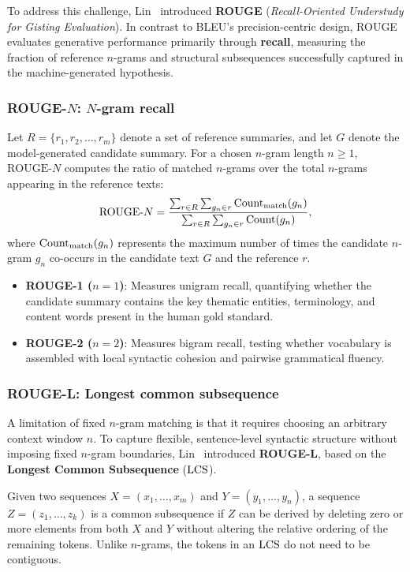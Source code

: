 \documentclass[../../../main.tex]{subfiles}
\begin{document}
To address this challenge, Lin~\cite{lin2004rouge} introduced \textbf{ROUGE} (\textit{Recall-Oriented Understudy for Gisting Evaluation}). In contrast to BLEU's precision-centric design, ROUGE evaluates generative performance primarily through \textbf{recall}, measuring the fraction of reference $n$-grams and structural subsequences successfully captured in the machine-generated hypothesis.

\subsubsection{ROUGE-$N$: $N$-gram recall}
Let $R = \{r_1, r_2, \dots, r_m\}$ denote a set of reference summaries, and let $G$ denote the model-generated candidate summary. For a chosen $n$-gram length $n \ge 1$, $\text{ROUGE-}N$ computes the ratio of matched $n$-grams over the total $n$-grams appearing in the reference texts:
\begin{equation}
\label{eq:rouge_n_def}
\text{ROUGE-}N = \frac{\sum_{r \in R} \sum_{g_n \in r} \operatorname{Count}_{\text{match}}(g_n)}{\sum_{r \in R} \sum_{g_n \in r} \operatorname{Count}(g_n)},
\end{equation}
where $\operatorname{Count}_{\text{match}}(g_n)$ represents the maximum number of times the candidate $n$-gram $g_n$ co-occurs in the candidate text $G$ and the reference $r$.
\begin{itemize}
    \item \textbf{ROUGE-1 ($n=1$)}: Measures unigram recall, quantifying whether the candidate summary contains the key thematic entities, terminology, and content words present in the human gold standard.
    \item \textbf{ROUGE-2 ($n=2$)}: Measures bigram recall, testing whether vocabulary is assembled with local syntactic cohesion and pairwise grammatical fluency.
\end{itemize}

\subsubsection{ROUGE-L: Longest common subsequence}
A limitation of fixed $n$-gram matching is that it requires choosing an arbitrary context window $n$. To capture flexible, sentence-level syntactic structure without imposing fixed $n$-gram boundaries, Lin~\cite{lin2004rouge} introduced \textbf{ROUGE-L}, based on the \textbf{Longest Common Subsequence} ($\operatorname{LCS}$).

Given two sequences $X = (x_1, \dots, x_m)$ and $Y = (y_1, \dots, y_n)$, a sequence $Z = (z_1, \dots, z_k)$ is a common subsequence if $Z$ can be derived by deleting zero or more elements from both $X$ and $Y$ without altering the relative ordering of the remaining tokens. Unlike $n$-grams, the tokens in an $\operatorname{LCS}$ do not need to be contiguous.
\end{document}
